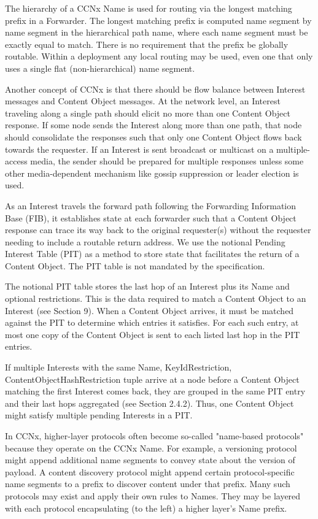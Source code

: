\documentclass[12pt]{article}
\begin{document}
The hierarchy of a CCNx Name is used for routing via the longest
matching prefix in a Forwarder.  The longest matching prefix is
computed name segment by name segment in the hierarchical path name,
where each name segment must be exactly equal to match.  There is no
requirement that the prefix be globally routable.  Within a
deployment any local routing may be used, even one that only uses a
single flat (non-hierarchical) name segment.

Another concept of CCNx is that there should be flow balance between
Interest messages and Content Object messages.  At the network level,
an Interest traveling along a single path should elicit no more than
one Content Object response.  If some node sends the Interest along
more than one path, that node should consolidate the responses such
that only one Content Object flows back towards the requester.  If an
Interest is sent broadcast or multicast on a multiple-access media,
the sender should be prepared for multiple responses unless some
other media-dependent mechanism like gossip suppression or leader
election is used.

As an Interest travels the forward path following the Forwarding
Information Base (FIB), it establishes state at each forwarder such
that a Content Object response can trace its way back to the original
requester(s) without the requester needing to include a routable
return address.  We use the notional Pending Interest Table (PIT) as
a method to store state that facilitates the return of a Content
Object.  The PIT table is not mandated by the specification.

The notional PIT table stores the last hop of an Interest plus its
Name and optional restrictions.  This is the data required to match a
Content Object to an Interest (see Section 9).  When a Content Object
arrives, it must be matched against the PIT to determine which
entries it satisfies.  For each such entry, at most one copy of the
Content Object is sent to each listed last hop in the PIT entries.

If multiple Interests with the same {Name, KeyIdRestriction,
ContentObjectHashRestriction} tuple arrive at a node before a Content
Object matching the first Interest comes back, they are grouped in
the same PIT entry and their last hops aggregated (see
Section 2.4.2).  Thus, one Content Object might satisfy multiple
pending Interests in a PIT.

In CCNx, higher-layer protocols often become so-called "name-based
protocols" because they operate on the CCNx Name.  For example, a
versioning protocol might append additional name segments to convey
state about the version of payload.  A content discovery protocol
might append certain protocol-specific name segments to a prefix to
discover content under that prefix.  Many such protocols may exist
and apply their own rules to Names.  They may be layered with each
protocol encapsulating (to the left) a higher layer's Name prefix.
\end{document}
